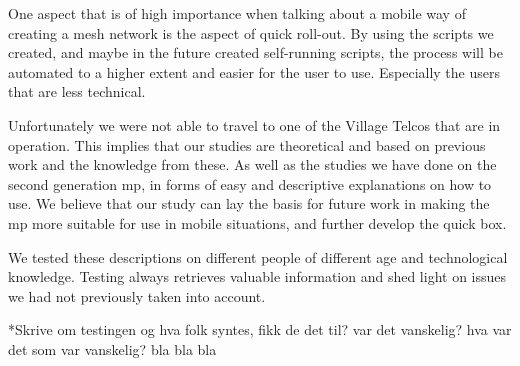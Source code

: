 One aspect that is of high importance when talking about a mobile way of creating a mesh network is the aspect of quick roll-out. By using the scripts we created, and maybe in the future created self-running scripts, the process will be automated to a higher extent and easier for the user to use. Especially the users that are less technical. 

Unfortunately we were not able to travel to one of the Village Telcos that are in operation. This implies that our studies are theoretical and based on previous work and the knowledge from these. As well as the studies we have done on the second generation \gls{mp}, in forms of easy and descriptive explanations on how to use. We believe that our study can lay the basis for future work in making the \gls{mp} more suitable for use in mobile situations, and further develop the \gls{quick} box. 

We tested these descriptions on different people of different age and technological knowledge. Testing always retrieves valuable information and shed light on issues we had not previously taken into account. 

*Skrive om testingen og hva folk syntes, fikk de det til? var det vanskelig? hva var det som var vanskelig? bla bla bla





 



